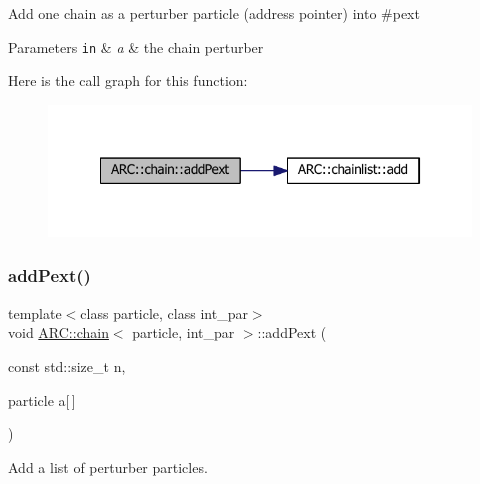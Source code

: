 Add one chain as a perturber particle (address pointer) into \#pext 
\begin{DoxyParams}[1]{Parameters}
\mbox{\tt in}  & {\em a} & the chain perturber \\
\hline
\end{DoxyParams}
Here is the call graph for this function\+:
\nopagebreak
\begin{figure}[H]
\begin{center}
\leavevmode
\includegraphics[width=322pt]{classARC_1_1chain_a964e4afb654f3d380969aa2326a287cc_cgraph}
\end{center}
\end{figure}
\hypertarget{classARC_1_1chain_a6b5cf35f505262d9d2326abb2904d91d}{}\label{classARC_1_1chain_a6b5cf35f505262d9d2326abb2904d91d} 
\subsubsection{\texorpdfstring{add\+Pext()}{addPext()}\hspace{0.1cm}{\footnotesize\ttfamily [3/3]}}
{\footnotesize\ttfamily template$<$class particle, class int\+\_\+par$>$ \\
void \hyperlink{classARC_1_1chain}{A\+R\+C\+::chain}$<$ particle, int\+\_\+par $>$\+::add\+Pext (\begin{DoxyParamCaption}\item[{const std\+::size\+\_\+t}]{n,  }\item[{particle}]{a\mbox{[}$\,$\mbox{]} }\end{DoxyParamCaption})\hspace{0.3cm}{\ttfamily [inline]}}



Add a list of perturber particles. 

